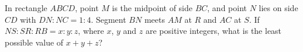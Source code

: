 In rectangle $ABCD$, point $M$ is the midpoint of side $BC$, and point $N$ lies on side $CD$ with $DN:NC=1:4$. Segment $BN$ meets $AM$ at $R$ and $AC$ at $S$. If $NS:SR:RB=x:y:z$, where $x$, $y$ and $z$ are positive integers, what is the least possible value of $x+y+z$?
